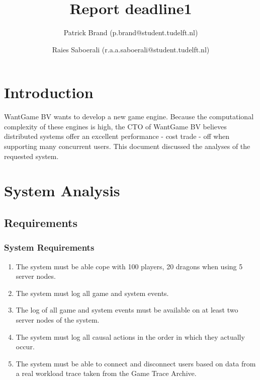 \documentclass{article}
\title{Report deadline1
}
\author{Patrick Brand (p.brand@student.tudelft.nl) \and
    Raies Saboerali (r.a.a.saboerali@student.tudelft.nl)}
\date{}
\begin{document}
\maketitle
\thispagestyle{empty}

\section{Introduction}
WantGame BV wants to develop a new game engine. Because the computational complexity of these engines is high, the CTO of WantGame BV believes distributed systems offer an excellent performance - cost trade - off when supporting many concurrent users. This document discussed the analyses of the requested system.

\section{System Analysis}
\subsection{Requirements}
\subsubsection{System Requirements}
\begin{enumerate}
	\item The system must be able cope with 100 players, 20 dragons when using 5 server nodes.
	\item The system must log all game and system events.
	\item The log of all game and system events must be available on at least two server nodes of the system.
	\item The system must log all causal actions in the order in which they actually occur.
	\item The system must be able to connect and disconnect users based on data from a real workload trace taken from the Game Trace Archive.
\end{enumerate}
\end{document}
